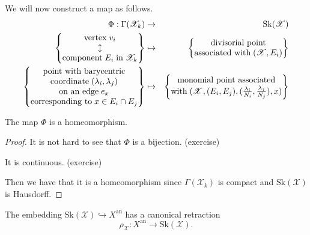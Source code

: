 We will now construct a map as follows.
\begin{eqnarray*}
\Phi:\Gamma(\mathscr{X}_{k}) &\rightarrow &\mathrm{Sk}(\mathscr{X})\\
\left\{
\begin{array}{@{}c@{}}
\text{vertex} \; v_{i} \\
\updownarrow \\
\text{component}\; E_{i} \; \text{in} \; \mathscr{X}_{k}
\end{array}
\right\}
&\mapsto &
\left\{
\begin{array}{@{}c@{}}
\text{divisorial point} \\
\text{associated with} \; (\mathscr{X},E_{i})
\end{array}
\right\}\\
\left\{
\begin{array}{@{}c@{}}
\text{point with barycentric} \\
\text{coordinate} \; (\lambda_{i},\lambda_{j}) \\
\text{on an edge} \; e_{x} \\
\text{corresponding to}\; x\in E_{i}\cap E_{j}
\end{array}
\right\}
&\mapsto &
\left\{
\begin{array}{@{}c@{}}
\text{monomial point associated} \\
\text{with} \; (\mathscr{X},(E_{i},E_{j}),(\frac{\lambda_{i}}{N_{i}},\frac{\lambda_{j}}{N_{j}}),x)
\end{array}
\right\}
\end{eqnarray*}

\begin{proposition}
The map $\Phi$ is a homeomorphism.
\end{proposition}

\begin{proof}
It is not hard to see that $\Phi$ is a bijection. (exercise)

It is continuous. (exercise)

Then we have that it is a homeomorphism since $\Gamma(\mathscr{X}_{k})$ is compact and $\mathrm{Sk}(\mathscr{X})$ is
Hausdorff.
\end{proof}

\begin{proposition}
The embedding $\mathrm{Sk}(\mathscr{X})\hookrightarrow X^{\mathrm{an}}$ has a canonical retraction
\[ \rho_{\mathscr{X}}:X^{\mathrm{an}}\rightarrow\mathrm{Sk}(\mathscr{X}). \]
\end{proposition}

